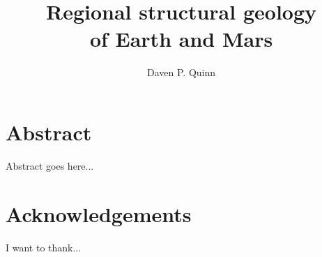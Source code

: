 \documentclass[letterpaper,12pt]{report}
\title{Regional structural geology\\ of Earth and Mars}
\author{Daven P. Quinn}
\date{}
\begin{document}
\maketitle


\chapter*{Abstract}
Abstract goes here...

\chapter*{Acknowledgements}
I want to thank...

\tableofcontents
\listoftables
\listoffigures





\end{document}

